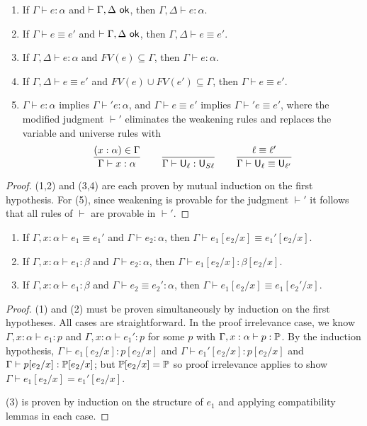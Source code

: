 \begin{lemma}[Weakening]\label{weak}
\begin{enumerate}
\item If $\Gamma\vdash e:\alpha$ and $\vdash\Gamma,\Delta\ok$, then $\Gamma,\Delta\vdash e:\alpha$.
\item If $\Gamma\vdash e\equiv e'$ and $\vdash\Gamma,\Delta\ok$, then $\Gamma,\Delta\vdash e\equiv e'$.
\item If $\Gamma,\Delta\vdash e:\alpha$ and $FV(e)\subseteq\Gamma$, then $\Gamma\vdash e:\alpha$.
\item If $\Gamma,\Delta\vdash e\equiv e'$ and $FV(e)\cup FV(e')\subseteq\Gamma$, then $\Gamma\vdash e\equiv e'$.
\item $\Gamma\vdash e:\alpha$ implies $\Gamma\vdash' e:\alpha$, and $\Gamma\vdash e\equiv e'$ implies $\Gamma\vdash' e\equiv e'$, where the modified judgment $\vdash'$ eliminates the weakening rules and replaces the variable and universe rules with
$$\frac{(x:\alpha)\in\Gamma}{\Gamma\vdash x:\alpha}\qquad\frac{}{\Gamma\vdash \U_\ell:\U_{S\ell}}\qquad\frac{\ell\equiv\ell'}{\Gamma\vdash \U_\ell\equiv\U_{\ell'}}$$
\end{enumerate}
\end{lemma}
\begin{proof}
(1,2) and (3,4) are each proven by mutual induction on the first hypothesis. For (5), since weakening is provable for the judgment $\vdash'$ it follows that all rules of $\vdash$ are provable in $\vdash'$.
\end{proof}

\begin{lemma}\label{subst}
\begin{enumerate}
\item If $\Gamma,x:\alpha\vdash e_1\equiv e_1'$ and $\Gamma\vdash e_2:\alpha$, then $\Gamma\vdash e_1[e_2/x]\equiv e_1'[e_2/x]$.
\item\label{subst_ty} If $\Gamma,x:\alpha\vdash e_1:\beta$ and $\Gamma\vdash e_2:\alpha$, then $\Gamma\vdash e_1[e_2/x]:\beta[e_2/x]$.
\item If $\Gamma,x:\alpha\vdash e_1:\beta$ and $\Gamma\vdash e_2\equiv e_2':\alpha$, then $\Gamma\vdash e_1[e_2/x]\equiv e_1[e_2'/x]$.
\end{enumerate}
\end{lemma}
\begin{proof} (1) and (2) must be proven simultaneously by induction on the first hypotheses. All cases are straightforward. In the proof irrelevance case, we know $\Gamma,x:\alpha\vdash e_1:p$ and $\Gamma,x:\alpha\vdash e_1':p$ for some $p$ with $\Gamma,x:\alpha\vdash p:\P$. By the induction hypothesis, $\Gamma\vdash e_1[e_2/x]:p[e_2/x]$ and $\Gamma\vdash e_1'[e_2/x]:p[e_2/x]$ and $\Gamma\vdash p[e_2/x]:\P[e_2/x]$; but $\P[e_2/x]=\P$ so proof irrelevance applies to show $\Gamma\vdash e_1[e_2/x]=e_1'[e_2/x]$.

(3) is proven by induction on the structure of $e_1$ and applying compatibility lemmas in each case.
\end{proof}

